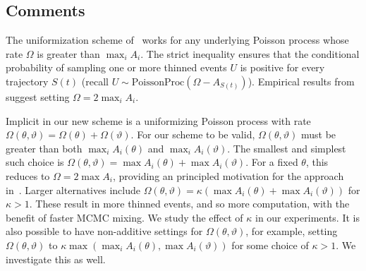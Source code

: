 \subsection{Comments}\label{sec:comments}

The uniformization scheme of~\cite{RaoTeh13} works for any underlying Poisson
process whose rate $\Omega$ is greater than $\max_i A_i$. The strict inequality
ensures that the conditional probability of sampling one or more thinned events 
$U$ is positive for every trajectory $S(t)$ (recall 
$U \sim \text{PoissonProc}(\Omega-A_{S(t)})$). Empirical results from~\cite{RaoTeh13}
suggest setting $\Omega = 2 \max_i A_i$.

Implicit in our new scheme is a uniformizing Poisson process with rate
$\Omega(\theta,\vartheta) = \Omega(\theta) + \Omega(\vartheta)$. For our 
scheme to be valid, $\Omega(\theta,\vartheta)$ must be greater than both
$\max_i A_i(\theta)$ and $\max_i A_i(\vartheta)$. The smallest and simplest such
choice is $\Omega(\theta,\vartheta) = \max A_i(\theta) + \max A_i(\vartheta)$.
For a fixed $\theta$, this reduces to $\Omega = 2\max A_i$, providing
an principled motivation for the approach in~\cite{RaoTeh13}.
Larger alternatives include 
$\Omega(\theta,\vartheta) = \kappa(\max A_i(\theta) + \max A_i(\vartheta))$
for $\kappa > 1$.  These result in more thinned events, and so more 
computation, with the benefit of faster MCMC mixing. We study the effect of 
$\kappa$ in our experiments.
It is also possible to have non-additive settings for $\Omega(\theta,\vartheta)$,
for example, setting $\Omega(\theta,\vartheta)$ to 
$\kappa \max( \max_i A_i(\theta), \max A_i(\vartheta))$ for some choice of $\kappa
> 1$. We investigate this as well.


